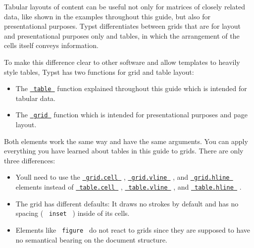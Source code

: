 Tabular layouts of content can be useful not only for matrices of
closely related data, like shown in the examples throughout this guide,
but also for presentational purposes. Typst differentiates between grids
that are for layout and presentational purposes only and tables, in
which the arrangement of the cells itself conveys information.

To make this difference clear to other software and allow templates to
heavily style tables, Typst has two functions for grid and table layout:

\begin{itemize}
\tightlist
\item
  The \href{/docs/reference/model/table/}{\texttt{\ table\ }} function
  explained throughout this guide which is intended for tabular data.
\item
  The \href{/docs/reference/layout/grid/}{\texttt{\ grid\ }} function
  which is intended for presentational purposes and page layout.
\end{itemize}

Both elements work the same way and have the same arguments. You can
apply everything you have learned about tables in this guide to grids.
There are only three differences:

\begin{itemize}
\tightlist
\item
  You\textquotesingle ll need to use the
  \href{/docs/reference/layout/grid/\#definitions-cell}{\texttt{\ grid.cell\ }}
  ,
  \href{/docs/reference/layout/grid/\#definitions-vline}{\texttt{\ grid.vline\ }}
  , and
  \href{/docs/reference/layout/grid/\#definitions-hline}{\texttt{\ grid.hline\ }}
  elements instead of
  \href{/docs/reference/model/table/\#definitions-cell}{\texttt{\ table.cell\ }}
  ,
  \href{/docs/reference/model/table/\#definitions-vline}{\texttt{\ table.vline\ }}
  , and
  \href{/docs/reference/model/table/\#definitions-hline}{\texttt{\ table.hline\ }}
  .
\item
  The grid has different defaults: It draws no strokes by default and
  has no spacing ( \texttt{\ inset\ } ) inside of its cells.
\item
  Elements like \texttt{\ figure\ } do not react to grids since they are
  supposed to have no semantical bearing on the document structure.
\end{itemize}

\href{/docs/guides/page-setup-guide/}{\pandocbounded{}}


